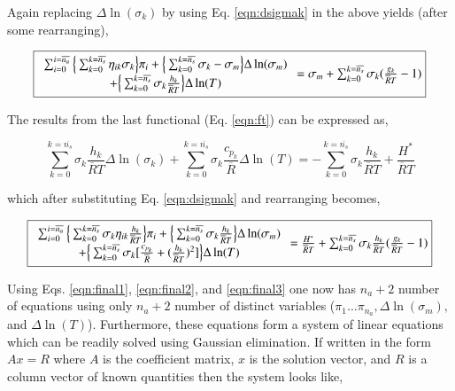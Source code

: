 	Again replacing $\Delta \ln(\sigma_k)$ by using Eq. \ref{eqn:dsigmak} in the above yields
(after some rearranging),

\begin{equation}
	\fbox{$
	\begin{array}{c}
	\sum_{i=0}^{i=\overline{n_a}}\Big\{\sum_{k=0}^{k=\overline{n_s}}\eta_{ik}\sigma_k\Big\}\pi_i +
	\Big\{\sum_{k=0}^{k=\overline{n_s}}\sigma_k - \sigma_m\Big\} \Delta \ln(\sigma_m) \\+ 
	\Big\{\sum_{k=0}^{k=\overline{n_s}}\sigma_k\frac{h_k}{\overline{R}T}\Big\}\Delta \ln(T) 
	\end{array}	
	=\sigma_m + \sum_{k=0}^{k=\overline{n_s}}\sigma_k(\frac{g_k}{\overline{R}T} - 1)
	$}
\label{eqn:final2}
\end{equation}

	The results from the last functional (Eq. \ref{eqn:ft}) can be expressed as,

\begin{displaymath}
	\sum_{k=0}^{k=\overline{n_s}}\sigma_k\frac{h_k}{\overline{R}T}\Delta \ln(\sigma_k) +
	\sum_{k=0}^{k=\overline{n_s}}\sigma_k\frac{c_{p_k}}{\overline{R}}\Delta \ln(T) = 
	-\sum_{k=0}^{k=\overline{n_s}}\sigma_k\frac{h_k}{\overline{R}T} + \frac{H^*}{\overline{R}T}	
\end{displaymath}

	which after substituting Eq. \ref{eqn:dsigmak} and rearranging becomes,

\begin{equation}
	\fbox{$
	\begin{array}{c}
	\sum_{i=0}^{i=\overline{n_a}}\Big\{\sum_{k=0}^{k=\overline{n_s}}\sigma_k\eta_{ik}\frac{h_k}
	{\overline{R}T}\Big\}\pi_i + \Big\{\sum_{k=0}^{k=\overline{n_s}}\sigma_k\frac{h_k}
	{\overline{R}T}\Big\}\Delta \ln(\sigma_m) \\+
	\Big\{\sum_{k=0}^{k=\overline{n_s}}\sigma_k
	[\frac{c_{p_k}}{\overline{R}} + (\frac{h_k}{\overline{R}T})^2]\Big\}\Delta \ln(T) 
	\end{array} = 
	\frac{H^*}{\overline{R}T} + \sum_{k=0}^{k=\overline{n_s}}\sigma_k\frac{h_k}{\overline{R}T}
	(\frac{g_k}{\overline{R}T} - 1)
	$}
\label{eqn:final3}
\end{equation} 

	Using Eqs. \ref{eqn:final1}, \ref{eqn:final2}, and \ref{eqn:final3} one now has $n_a + 2$ 
number of equations using only $n_a + 2$ number of distinct variables ($\pi_1 \ldots \pi_{n_a},
\Delta \ln(\sigma_m),$ and $\Delta \ln(T)$).  Furthermore, these equations form a system of linear
equations which can be readily solved using Gaussian elimination.  If written in the form $Ax = R$ 
where $A$ is the coefficient matrix, $x$ is the solution vector, and $R$ is a column vector of known 
quantities then the system looks like,

